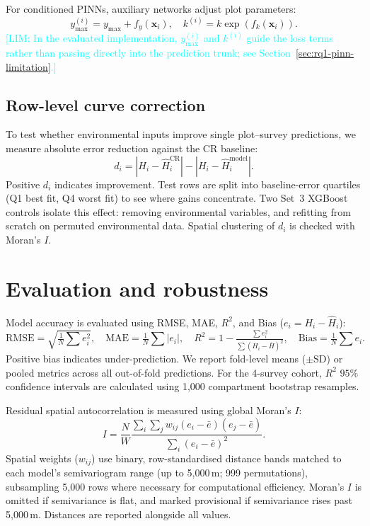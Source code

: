 \documentclass[logo,msc,ai]{infthesis}           %
\newcommand{\limit}[1]{\textcolor{cyan}{[LIM: #1]}}
\begin{document}
For conditioned PINNs, auxiliary networks adjust plot parameters:
\begin{equation}
y_{\max}^{(i)} = y_{\max}+f_y(\mathbf{x}_i), \quad k^{(i)} = k\exp\!\left(f_k(\mathbf{x}_i)\right).
\label{eq:param-adjust}
\end{equation}
\limit{In the evaluated implementation, $y_{\max}^{(i)}$ and $k^{(i)}$ guide the loss terms rather than passing directly into the prediction trunk; see Section~\ref{sec:rq1-pinn-limitation}.}

\subsection*{Row-level curve correction}
\label{sec:rq2a-method}
To test whether environmental inputs improve single plot--survey predictions, we measure absolute error reduction against the CR baseline:
\begin{equation}
d_i = \left|H_i-\hat H_i^{\mathrm{CR}}\right| - \left|H_i-\hat H_i^{\mathrm{model}}\right|.
\label{eq:residual-reduction}
\end{equation}
Positive $d_i$ indicates improvement. Test rows are split into baseline-error quartiles (Q1 best fit, Q4 worst fit) to see where gains concentrate. Two Set~3 XGBoost controls isolate this effect: removing environmental variables, and refitting from scratch on permuted environmental data. Spatial clustering of $d_i$ is checked with Moran's $I$.

\section{Evaluation and robustness}
\label{sec:eval-robustness}

Model accuracy is evaluated using RMSE, MAE, $R^2$, and Bias ($e_i = H_i - \hat H_i$):
\begin{equation}
\mathrm{RMSE}=\sqrt{\tfrac{1}{N}\textstyle\sum e_i^2}, \quad
\mathrm{MAE}=\tfrac{1}{N}\textstyle\sum |e_i|, \quad
R^2=1-\tfrac{\sum e_i^2}{\sum (H_i-\bar H)^2}, \quad
\mathrm{Bias}=\tfrac{1}{N}\textstyle\sum e_i.
\label{eq:eval-summary}
\end{equation}
Positive bias indicates under-prediction. We report fold-level means ($\pm\text{SD}$) or pooled metrics across all out-of-fold predictions. For the 4-survey cohort, $R^2$ $95\%$ confidence intervals are calculated using 1,000 compartment bootstrap resamples.

Residual spatial autocorrelation is measured using global Moran's $I$:
\begin{equation}
I=\frac{N}{W}\frac{\sum_i\sum_j w_{ij}(e_i-\bar e)(e_j-\bar e)}{\sum_i(e_i-\bar e)^2}.
\label{eq:morans-i}
\end{equation}
Spatial weights ($w_{ij}$) use binary, row-standardised distance bands matched to each model's semivariogram range (up to 5,000\,m; 999 permutations), subsampling 5,000 rows where necessary for computational efficiency. Moran's $I$ is omitted if semivariance is flat, and marked provisional if semivariance rises past 5,000\,m. Distances are reported alongside all values.
\end{document}
